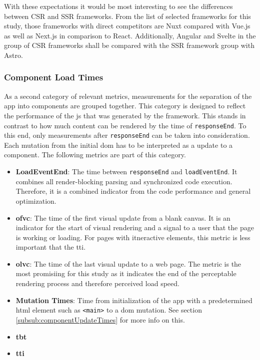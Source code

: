 \documentclass[a4paper, 10pt]{article}
\begin{document}
With these expectations it would be most interesting to see the differences between CSR and SSR frameworks.
From the list of selected frameworks for this study, those frameworks with direct competitors are Nuxt compared with Vue.js as well as Next.js in comparison to React.
Additionally, Angular and Svelte in the group of CSR frameworks shall be compared with the SSR framework group with Astro.

\subsubsection{Component Load Times}
% 

As a second category of relevant metrics, measurements for the separation of the app into components are grouped together.
This category is designed to reflect the performance of the \acrlong{js} that was generated by the framework.
This stands in contrast to how much content can be rendered by the time of \verb|responseEnd|.
To this end, only measurements after \verb|responseEnd| can be taken into consideration.
Each mutation from the initial \acrshort{dom} has to be interpreted as a update to a component.
The following metrics are part of this category.

\begin{itemize}
  \item \textbf{LoadEventEnd}: The time between \verb|responseEnd| and \verb|loadEventEnd|.
  It combines all render-blocking parsing and synchronized code execution.
  Therefore, it is a combined indicator from the code performance and general optimization.
  \item \textbf{\acrfull{ofvc}}: The time of the first visual update from a blank canvas.
  It is an indicator for the start of visual rendering and a signal to a user that the page is working or loading.
  For pages with itneractive elements, this metric is less important that the \acrshort{tti}.
  \item \textbf{\acrfull{olvc}}: The time of the last visual update to a web page.
  The metric is the most promisiing for this study as it indicates the end of the perceptable rendering process and therefore perceived load speed.
  \item \textbf{Mutation Times}: Time from initialization of the app with a predetermined \acrshort{html} element such as \verb|<main>| to a \acrshort{dom} mutation.
  See section \ref{subsub:componentUpdateTimes} for more info on this.
  \item \textbf{\acrshort{tbt}}
  \item \textbf{\acrshort{tti}}
\end{itemize}
\end{document}
